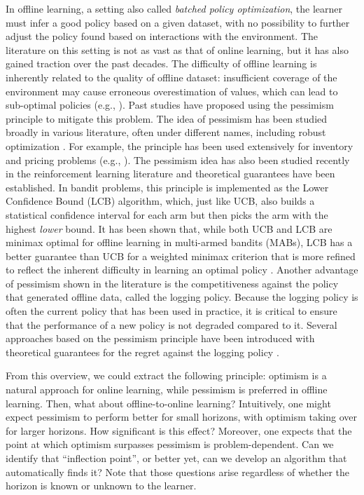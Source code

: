 In offline learning, a setting also called \textit{batched policy optimization}, the learner must infer a good policy based on a given dataset, with no possibility to further adjust the policy found based on interactions with the environment. The literature on this setting is not as vast as that of online learning, but it has also gained traction over the past decades. 
The difficulty of offline learning is inherently related to the quality of offline dataset: insufficient coverage of the environment may cause erroneous overestimation of values, which can lead to sub-optimal policies 
(e.g., \citealt{fujimoto2019offpolicydeepreinforcementlearning}). Past studies have proposed using the pessimism principle to mitigate this problem. 
The idea of pessimism has been studied broadly in various literature, often under different names, including robust optimization \citep{ben2002robust, bertsimas2011theory}. For example, the principle has been used extensively for inventory and pricing problems (e.g., \citealt{bertsimas2006robust, bu2023offline, perakis2008regret, xu2022robust}). The pessimism idea has also been studied recently in the reinforcement learning literature \citep{swaminathan2015batch, wu2019behavior,kidambi2020morel, li2022pessimismofflinelinearcontextual, jin2022policy, rashidinejad2023bridgingofflinereinforcementlearning, yin2021towards} and theoretical guarantees have been established. In bandit problems, this principle is implemented as the Lower Confidence Bound (LCB) algorithm, which, just like UCB, also builds a statistical confidence interval for each arm but then picks the arm with the highest \emph{lower} bound. It has been shown that, while both UCB and LCB are minimax optimal for offline learning in multi-armed bandits (MABs), LCB has a better guarantee than UCB for a weighted minimax criterion that is more refined to reflect the inherent difficulty in learning an optimal policy \citep{xiao2021optimalitybatchpolicyoptimization}.
Another advantage of pessimism shown in the literature is the competitiveness against the policy that generated offline data, called the logging policy. Because the logging policy is often the current policy that has been used in practice, it is critical to ensure that the performance of a new policy is not degraded compared to it.  Several approaches based on the pessimism principle have been introduced with theoretical guarantees for the regret against the logging policy \citep{xie2022armormodelbasedframeworkimproving, cheng2022adversarially}. 

From this overview, we could extract the following principle: optimism is a natural approach for online learning, while pessimism is preferred in offline learning. Then, what about offline-to-online learning? Intuitively, one might expect pessimism to perform better for small horizons, with optimism taking over for larger horizons. How significant is this effect? Moreover, one expects that the point at which optimism surpasses pessimism is problem-dependent. Can we identify that ``inflection point'', or better yet,  can we develop an algorithm that automatically finds it? Note that those questions arise regardless of whether the horizon is known or unknown to the learner.




